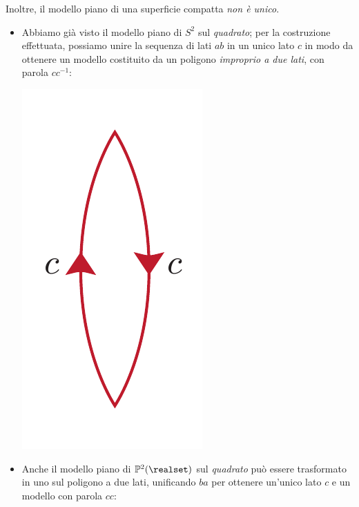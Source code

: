 \begin{observe}
\begin{center}
\end{center}
 Inoltre, il modello piano di una superficie compatta \textit{non è unico}.
\end{observe}

\begin{examples}
	\begin{itemize}
		\item Abbiamo già visto il modello piano di $S^2$ sul \textit{quadrato}; per la costruzione effettuata, possiamo unire la sequenza di lati $ab$ in un unico lato $c$ in modo da ottenere un modello costituito da un poligono \textit{improprio a due lati}, con parola $cc^{-1}$:
		\begin{center}
			\includegraphics[trim=0cm 0cm 0cm 0cm, clip, scale=0.375]{images/sphere2lines.pdf}
		\end{center}
		\item Anche il modello piano di $\mathbb{P}^2(\realset)$ sul \textit{quadrato} può essere trasformato in uno sul poligono a due lati, unificando $ba$ per ottenere un'unico lato $c$ e un modello con parola $cc$:
		\begin{center}

\end{center}
\end{itemize}
\end{examples}
